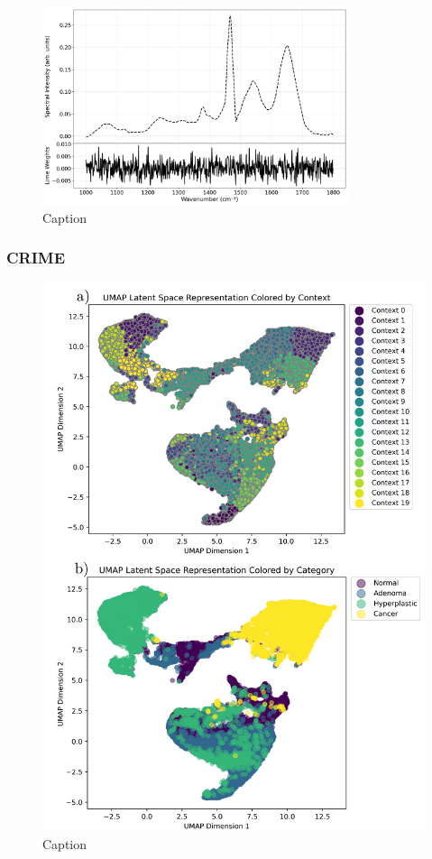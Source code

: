 \begin{figure}[htbp]
  \centering
  \includegraphics[width=0.8\textwidth]{Images/lime_weights_example.png}
  \caption{Caption}
  \label{fig:my-label}
\end{figure}

\subsubsection{CRIME}
\begin{figure}[htbp]
  \centering
  \includegraphics[width=1\textwidth]{Images/crime_umap.png}
  \caption{Caption}
  \label{fig:my-label}
\end{figure}
